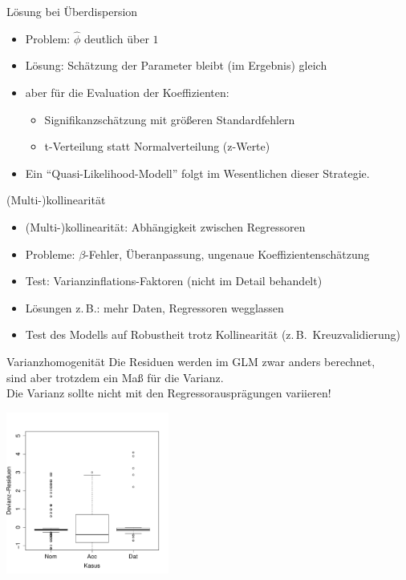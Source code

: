 \begin{frame}
  {Lösung bei Überdispersion}
  \begin{itemize}[<+->]
    \item Problem: \alert{$\hat{\phi}$ deutlich über $1$}
    \item Lösung: Schätzung der Parameter bleibt (im Ergebnis) gleich
    \item aber für die Evaluation der Koeffizienten:
      \begin{itemize}[<+->]
	\item Signifikanzschätzung mit größeren Standardfehlern
	\item t-Verteilung statt Normalverteilung (z-Werte)
      \end{itemize}
     \vspace{0.5cm}
    \item Ein "`Quasi-Likelihood-Modell"' folgt im Wesentlichen dieser Strategie.
  \end{itemize}
\end{frame}

\begin{frame}
  {(Multi-)kollinearität}
  \begin{itemize}[<+->]
    \item \alert{(Multi-)kollinearität}: Abhängigkeit zwischen Regressoren
    \item Probleme: $\beta$-Fehler, Überanpassung, ungenaue Koeffizientenschätzung
    \item Test: \alert{Varianzinflations-Faktoren} (nicht im Detail behandelt)
    \item Lösungen z.\,B.: mehr Daten, Regressoren wegglassen
    \item Test des Modells auf Robustheit trotz Kollinearität (z.\,B.\ Kreuzvalidierung)
  \end{itemize}
\end{frame}

\begin{frame}
  {Varianzhomogenität}
  Die Residuen werden im GLM zwar anders berechnet,\\
  sind aber trotzdem ein Maß für die Varianz.\\[3ex]
  \alert{Die Varianz sollte nicht mit den Regressorausprägungen variieren!}\\

  \begin{center}
    \includegraphics[width=0.4\textwidth]{graphics/glmvarianz}
  \end{center}
\end{frame}

